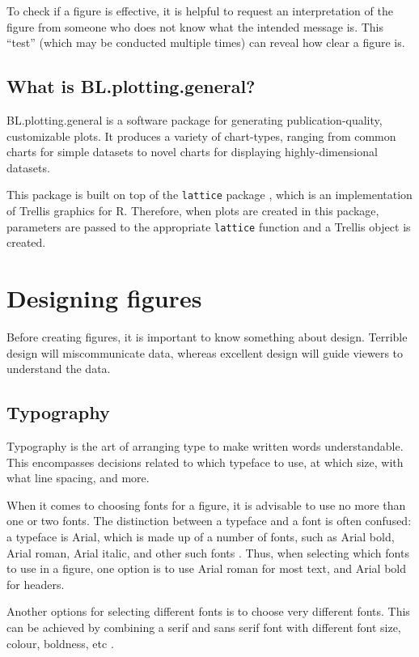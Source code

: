 \documentclass[letterpaper]{report}\usepackage[]{graphicx}\usepackage[]{color}
\begin{document}
To check if a figure is effective, it is helpful to request an interpretation of the figure from someone who does not know what the intended message is. This ``test'' (which may be conducted multiple times) can reveal how clear a figure is.

\subsection{What is BL.plotting.general?}
BL.plotting.general is a software package for generating publication-quality, customizable plots. It produces a variety of chart-types, ranging from common charts for simple datasets to novel charts for displaying highly-dimensional datasets.

This package is built on top of the \texttt{lattice} package \cite{lattice}, which is an implementation of Trellis graphics\cite{trellis} for R. Therefore, when plots are created in this package, parameters are passed to the appropriate \texttt{lattice} function and a Trellis object is created. 

\section{Designing figures}
Before creating figures, it is important to know something about design. Terrible design will miscommunicate data, whereas excellent design will guide viewers to understand the data\cite{tufte}. 

\subsection{Typography}
Typography is the art of arranging type to make written words understandable. This encompasses decisions related to which typeface to use, at which size, with what line spacing, and more. 

When it comes to choosing fonts for a figure, it is advisable to use no more than one or two fonts. The distinction between a typeface and a font is often confused: a typeface is Arial, which is made up of a number of fonts, such as Arial bold, Arial roman, Arial italic, and other such fonts \cite{wong-type}. Thus, when selecting which fonts to use in a figure, one option is to use Arial roman for most text, and Arial bold for headers.

Another options for selecting different fonts is to choose very different fonts. This can be achieved by combining a serif and sans serif font with different font size, colour, boldness, etc \cite{williams}.
\end{document}
